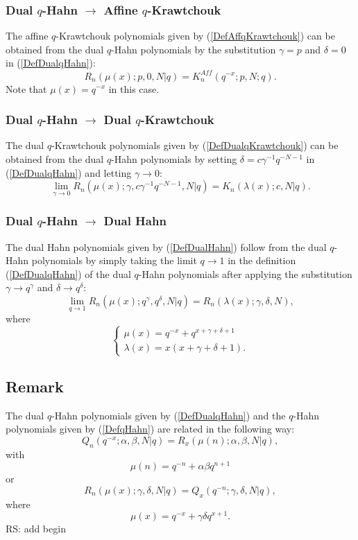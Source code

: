 \documentclass[envcountchap,graybox]{svmono}
\newcounter{rom}
\begin{document}
\subsubsection*{Dual $q$-Hahn $\rightarrow$ Affine $q$-Krawtchouk}
The affine $q$-Krawtchouk polynomials given by (\ref{DefAffqKrawtchouk})
can be obtained from the dual $q$-Hahn polynomials by the substitution $\gamma=p$
and $\delta=0$ in (\ref{DefDualqHahn}):
\begin{equation}
R_n(\mu(x);p,0,N|q)=K_n^{Aff}(q^{-x};p,N;q).
\end{equation}
Note that $\mu(x)=q^{-x}$ in this case.

\subsubsection*{Dual $q$-Hahn $\rightarrow$ Dual $q$-Krawtchouk}
The dual $q$-Krawtchouk polynomials given by (\ref{DefDualqKrawtchouk}) can
be obtained from the dual $q$-Hahn polynomials by setting $\delta=c\gamma^{-1}q^{-N-1}$
in (\ref{DefDualqHahn}) and letting $\gamma\rightarrow 0$:
\begin{equation}
\lim_{\gamma\rightarrow 0}
R_n(\mu(x);\gamma,c\gamma^{-1}q^{-N-1},N|q)=K_n(\lambda(x);c,N|q).
\end{equation}

\subsubsection*{Dual $q$-Hahn $\rightarrow$ Dual Hahn}
The dual Hahn polynomials given by (\ref{DefDualHahn}) follow from the dual $q$-Hahn
polynomials by simply taking the limit $q\rightarrow 1$ in the definition (\ref{DefDualqHahn})
of the dual $q$-Hahn polynomials after applying the substitution
$\gamma\rightarrow q^{\gamma}$ and $\delta\rightarrow q^{\delta}$:
\begin{equation}
\lim_{q\rightarrow 1}R_n(\mu(x);q^{\gamma},q^{\delta},N|q)=R_n(\lambda(x);\gamma,\delta,N),
\end{equation}
where
$$\left\{\begin{array}{l}
\displaystyle\mu(x)=q^{-x}+q^{x+\gamma+\delta+1}\\[5mm]
\displaystyle\lambda(x)=x(x+\gamma+\delta+1).
\end{array}\right.$$

\subsection*{Remark}
The dual $q$-Hahn polynomials given by (\ref{DefDualqHahn}) and the
$q$-Hahn polynomials given by (\ref{DefqHahn}) are related in the following way:
$$Q_n(q^{-x};\alpha,\beta,N|q)=R_x(\mu(n);\alpha,\beta,N|q),$$
with
$$\mu(n)=q^{-n}+\alpha\beta q^{n+1}$$
or
$$R_n(\mu(x);\gamma,\delta,N|q)=Q_x(q^{-n};\gamma,\delta,N|q),$$
where
$$\mu(x)=q^{-x}+\gamma\delta q^{x+1}.$$
 RS: add begin\label{sec14.5}
%
\end{document}
